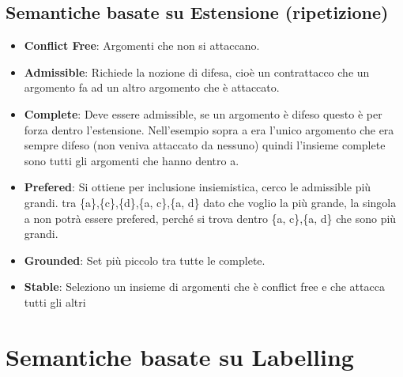     \section{Semantiche basate su Estensione (ripetizione)}
    \begin{itemize}
        \item \textbf{Conflict Free}: Argomenti che non si attaccano.
        \item \textbf{Admissible}: Richiede la nozione di difesa, cioè un
              contrattacco che un argomento fa ad un altro argomento che è attaccato.
        \item \textbf{Complete}: Deve essere admissible, se un argomento è
              difeso questo è per forza dentro l'estensione. Nell'esempio sopra a era
              l'unico argomento che era sempre difeso (non veniva attaccato da
              nessuno) quindi l'insieme complete sono tutti gli argomenti che hanno
              dentro a.
        \item \textbf{Prefered}: Si ottiene per inclusione insiemistica, cerco
              le admissible più grandi. tra \{a\},\{c\},\{d\},\{a, c\},\{a, d\} dato
              che voglio la più grande, la singola {a} non potrà essere prefered,
              perché si trova dentro \{a, c\},\{a, d\} che sono più grandi.
        \item \textbf{Grounded}: Set più piccolo tra tutte le complete.
        \item \textbf{Stable}: Seleziono un insieme di argomenti che è conflict
              free e che attacca tutti gli altri
    \end{itemize}

    \chapter{Semantiche basate su Labelling} \label{ch:Semantiche basate su
        Labelling}
